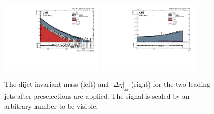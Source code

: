 \begin{figure}[h!]
\centering
\includegraphics[width=0.450\textwidth]{figures/analysis/search3/AN-17-303/controlPlots/looseSel_Dijet_invariant_mass.pdf}
\includegraphics[width=0.450\textwidth]{figures/analysis/search3/AN-17-303/controlPlots/looseSel_Deltaeta.pdf}
\caption{The dijet invariant mass (left) and $|\Delta\eta|_{jj}$ (right) for the two leading jets after preselections are applied. The signal is scaled by an arbitrary number to be visible.}
\label{fig:Mjj-all}
\end{figure}
